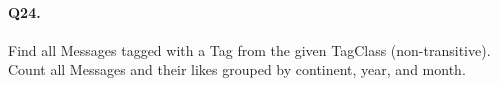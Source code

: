 \paragraph{Q24.}
Find all Messages tagged with a Tag from the given TagClass
(non-transitive).
Count all Messages and their likes grouped by continent, year, and
month.

